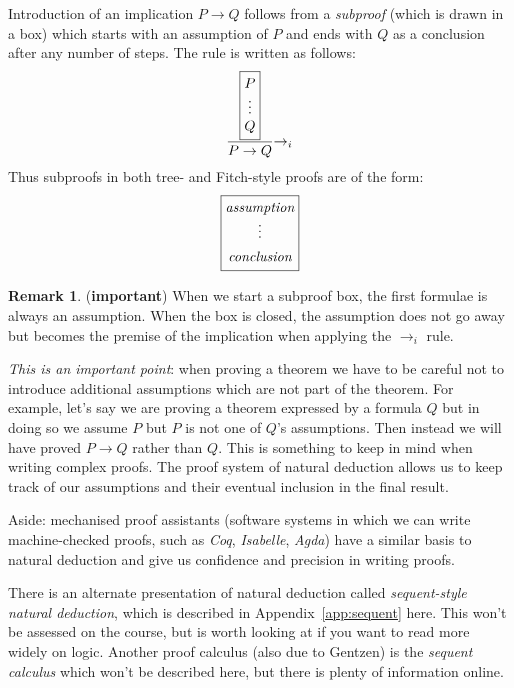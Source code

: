 \documentclass{article}
\theoremstyle{definition}
\newtheorem*{remark}{Remark}
\begin{document}
Introduction of an implication $P \rightarrow Q$ follows from a
\emph{subproof} (which is drawn in a box) which starts with an
assumption of $P$ and ends with $Q$ as a conclusion after any number
of steps. The rule is written as follows:
%
\begin{align*}
\setlength{\arraycolsep}{0em}
\dfrac{\fbox{$\begin{array}{c} P \\ \vdots \\ Q\end{array}$}}
      {P \rightarrow Q} {\rightarrow_i}
\end{align*}
%
Thus subproofs in both tree- and Fitch-style proofs
are of the form:
%
\begin{equation*}
\setlength{\arraycolsep}{0em}
\fbox{$\begin{array}{c} \textit{assumption} \\ \vdots \\[0.5em]
         \textit{conclusion} \end{array}$}
\end{equation*}
%
\begin{remark} (\textbf{important})
%
  When we start a subproof box, the first formulae is always an
  assumption. When the box is closed, the assumption does not go away
  but becomes the premise of the implication when applying the
  $\rightarrow_i$ rule.

  \emph{This is an important point}: when proving a theorem we
  have to be careful not to introduce additional assumptions which are
  not part of the theorem. For example, let's say we are proving a
  theorem expressed by a formula $Q$ but in doing so we assume $P$ 
  but $P$ is not one of $Q$'s assumptions.  Then
  instead we will have proved $P \rightarrow Q$ rather than $Q$.  This
  is something to keep in mind when writing complex
  proofs. The proof system of natural deduction allows us to keep
  track of our assumptions and their eventual inclusion in the final
  result.

  Aside: mechanised proof assistants (software systems in which we
  can write machine-checked proofs, such as \emph{Coq},
  \emph{Isabelle}, \emph{Agda}) have a similar basis to
  natural deduction and give us confidence and precision in writing proofs.
\end{remark}
%
There is an alternate presentation of natural deduction called
\emph{sequent-style natural deduction}, which is described in
Appendix~\ref{app:sequent} here. This won't be assessed on the course,
but is worth looking at if you want to read more widely on
logic. Another proof calculus (also due to Gentzen) is the
\emph{sequent calculus} which won't be described here, but there is 
plenty of information online.
\end{document}
